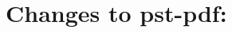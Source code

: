 \documentclass[draft]{ltxdoc}
\begin{document}
\section*{Changes to \textsf{pst-pdf}:}

\end{document}
